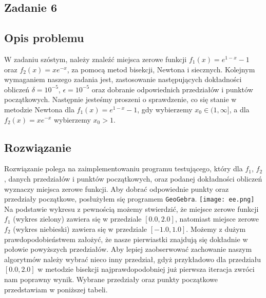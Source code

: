\documentclass{article}
\begin{document}
\begin{center}
    \section{Zadanie 6}
    \subsection{Opis problemu}
    \large W zadaniu szóstym, należy znaleźć miejsca zerowe funkcji \(f_{1}(x) = e^{1-x} - 1\) oraz \(f_{2}(x) = xe^{-x}\), za pomocą
     metod bisekcji, Newtona i siecznych. Kolejnym wymaganiem naszego zadania jest, zastosowanie następujących dokładności obliczeń \(\delta = 10^{-5}\), \(\epsilon = 10^{-5}\) oraz 
     dobranie odpowiednich przedziałów i punktów początkowych.    
     Następnie jesteśmy proszeni o sprawdzenie, co się stanie w metodzie Newtona dla \(f_{1}(x) = e^{1-x} - 1\), gdy wybierzemy \(x_{0} \in (1, \infty]\), 
     a dla \(f_{2}(x) = xe^{-x}\) wybierzemy \(x_{0} > 1\). 
    \subsection{Rozwiązanie}
    \large Rozwiązanie polega na zaimplementowaniu programu testującego, który dla \(f_{1}\), \(f_{2}\), danych przedziałów i punktów początkowych, oraz podanej dokładności obliczeń wyznaczy miejsca zerowe funkcji.
     Aby dobrać odpowiednie punkty oraz przedziały początkowe, posłużyłem się programem \texttt{GeoGebra}. \newline
     \newline
     \texttt{[image: ee.png]} \newline
     \newline
     Na podstawie wykresu z pewnością możemy stwierdzić, że miejsce zerowe funkcji \(f_{1}\) (wykres zielony) zawiera się w przedziale \([0.0, 2.0]\), 
     natomiast miejsce zerowe \(f_{2}\) (wykres niebieski) zawiera się w przedziale \([-1.0, 1.0]\). Możemy z dużym prawdopodobieństwem założyć, 
     że nasze pierwiastki znajdują się dokładnie w połowie powyższych przedziałów. Aby lepiej zaobserwować zachowanie naszym algorytmów
     należy wybrać nieco inny przedział, gdyż przykładowo dla przedziału \([0.0, 2.0]\) w metodzie bisekcji najprawdopodobniej już pierwsza iteracja zwróci nam poprawny wynik. \newline
     \newline
     Wybrane przedziały oraz punkty początkowe przedstawiam w poniższej tabeli. 


\end{center}
\end{document}
